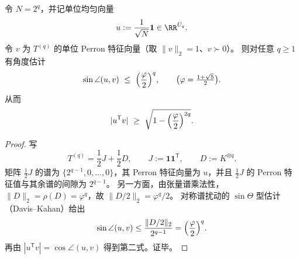\begin{theorem}\label{thm:pom-replica-softcore-perron-angle-uniform}
令 \(N=2^q\)，并记单位均匀向量
\[
u:=\frac{1}{\sqrt{N}}\mathbf 1\in\RR^{U_q}.
\]
令 \(v\) 为 \(T^{(q)}\) 的单位 Perron 特征向量（取 \(\|v\|_2=1\)、\(v\succ 0\)）。
则对任意 \(q\ge 1\) 有角度估计
\[
\sin\angle(u,v)\ \le\ \Bigl(\frac{\varphi}{2}\Bigr)^{q},
\qquad \bigl(\varphi=\tfrac{1+\sqrt5}{2}\bigr).
\]
从而
\[
|u^{\mathsf T}v|\ \ge\ \sqrt{1-\Bigl(\frac{\varphi}{2}\Bigr)^{2q}}.
\]
\end{theorem}
\begin{proof}
写
\[
T^{(q)}=\frac12J+\frac12D,\qquad
J:=\mathbf 1\mathbf 1^{\mathsf T},\qquad D:=K^{\otimes q}.
\]
矩阵 \(\frac12J\) 的谱为 \(\{2^{q-1},0,\dots,0\}\)，其 Perron 特征向量为 \(u\)，并且 \(\frac12J\) 的 Perron 特征值与其余谱的间隙为 \(2^{q-1}\)。
另一方面，由张量谱乘法性，\(\|D\|_2=\rho(D)=\varphi^q\)，故
\(
\|D/2\|_2=\varphi^q/2
\)。
对称谱扰动的 \(\sin\Theta\) 型估计（Davis--Kahan）给出
\[
\sin\angle(u,v)\le \frac{\|D/2\|_2}{2^{q-1}}=\Bigl(\frac{\varphi}{2}\Bigr)^q.
\]
再由 \(|u^{\mathsf T}v|=\cos\angle(u,v)\) 得到第二式。证毕。
\end{proof}


